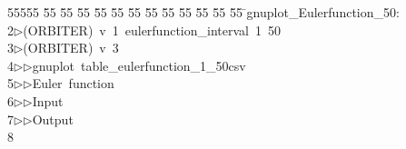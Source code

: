 %
%
\begin{tabbing}
55555 \= 55 \= 55 \= 55 \= 55 \= 55 \= 55 \= 55 \= 55 \= 55 \= 55 \= 55 \= 55 \= \>gnuplot\_Eulerfunction\_50:\\[0pt]
2\>$\triangleright$\>(ORBITER)\ v\ 1\ eulerfunction\_interval\ 1\ 50\\[0pt]
3\>$\triangleright$\>(ORBITER)\ v\ 3\ \\[0pt]
4\>$\triangleright$\>$\triangleright$\>gnuplot\ table\_eulerfunction\_1\_50csv\ \\[0pt]
5\>$\triangleright$\>$\triangleright$\>Euler\ function\ \\[0pt]
6\>$\triangleright$\>$\triangleright$\>Input\ \\[0pt]
7\>$\triangleright$\>$\triangleright$\>Output\\[0pt]
8\>\end{tabbing}
